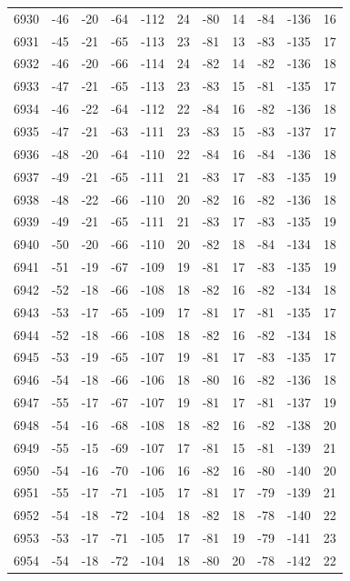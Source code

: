 \begin{table}[H]
\begin{tabular}{lllllllllll}
6930 & -46 & -20 & -64 & -112 & 24 & -80 & 14 & -84 & -136 & 16 \\
6931 & -45 & -21 & -65 & -113 & 23 & -81 & 13 & -83 & -135 & 17 \\
6932 & -46 & -20 & -66 & -114 & 24 & -82 & 14 & -82 & -136 & 18 \\
6933 & -47 & -21 & -65 & -113 & 23 & -83 & 15 & -81 & -135 & 17 \\
6934 & -46 & -22 & -64 & -112 & 22 & -84 & 16 & -82 & -136 & 18 \\
6935 & -47 & -21 & -63 & -111 & 23 & -83 & 15 & -83 & -137 & 17 \\
6936 & -48 & -20 & -64 & -110 & 22 & -84 & 16 & -84 & -136 & 18 \\
6937 & -49 & -21 & -65 & -111 & 21 & -83 & 17 & -83 & -135 & 19 \\
6938 & -48 & -22 & -66 & -110 & 20 & -82 & 16 & -82 & -136 & 18 \\
6939 & -49 & -21 & -65 & -111 & 21 & -83 & 17 & -83 & -135 & 19 \\
6940 & -50 & -20 & -66 & -110 & 20 & -82 & 18 & -84 & -134 & 18 \\
6941 & -51 & -19 & -67 & -109 & 19 & -81 & 17 & -83 & -135 & 19 \\
6942 & -52 & -18 & -66 & -108 & 18 & -82 & 16 & -82 & -134 & 18 \\
6943 & -53 & -17 & -65 & -109 & 17 & -81 & 17 & -81 & -135 & 17 \\
6944 & -52 & -18 & -66 & -108 & 18 & -82 & 16 & -82 & -134 & 18 \\
6945 & -53 & -19 & -65 & -107 & 19 & -81 & 17 & -83 & -135 & 17 \\
6946 & -54 & -18 & -66 & -106 & 18 & -80 & 16 & -82 & -136 & 18 \\
6947 & -55 & -17 & -67 & -107 & 19 & -81 & 17 & -81 & -137 & 19 \\
6948 & -54 & -16 & -68 & -108 & 18 & -82 & 16 & -82 & -138 & 20 \\
6949 & -55 & -15 & -69 & -107 & 17 & -81 & 15 & -81 & -139 & 21 \\
6950 & -54 & -16 & -70 & -106 & 16 & -82 & 16 & -80 & -140 & 20 \\
6951 & -55 & -17 & -71 & -105 & 17 & -81 & 17 & -79 & -139 & 21 \\
6952 & -54 & -18 & -72 & -104 & 18 & -82 & 18 & -78 & -140 & 22 \\
6953 & -53 & -17 & -71 & -105 & 17 & -81 & 19 & -79 & -141 & 23 \\
6954 & -54 & -18 & -72 & -104 & 18 & -80 & 20 & -78 & -142 & 22 \\

\end{tabular}
\end{table}
